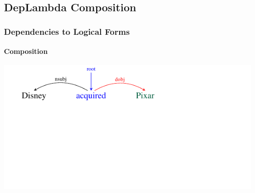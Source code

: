 \documentclass[mathserif,12pt]{beamer}
\begin{document}
\subsection{DepLambda Composition}
\begin{frame}
\frametitle{Dependencies to Logical Forms}
\framesubtitle{Composition}
\begin{center}
\includegraphics[trim=2em 9.4em 10em 0em,clip=true,scale=1.3]{figures/pixar_dobj}

\vspace{0.8cm}


\end{center}
\end{frame}
\end{document}
